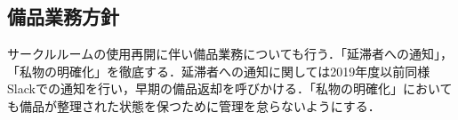 \subsection*{備品業務方針}


サークルルームの使用再開に伴い備品業務についても行う．「延滞者への通知」，「私物の明確化」を徹底する．延滞者への通知に関しては2019年度以前同様Slackでの通知を行い，早期の備品返却を呼びかける．「私物の明確化」においても備品が整理された状態を保つために管理を怠らないようにする．
